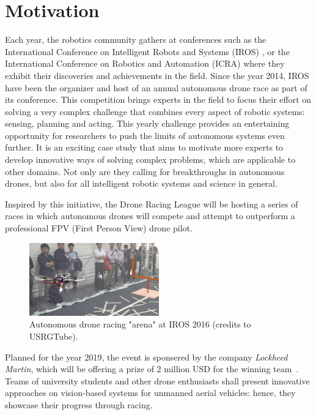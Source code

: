 \section{Motivation}


Each year, the robotics community gathers at conferences such as the
International Conference on Intelligent Robots and Systems (IROS) , or the
International Conference on Robotics and Automation (ICRA) where they exhibit
their discoveries and achievements in the field. Since the year 2014, IROS have
been the organizer and host of an annual autonomous drone race as part of its
conference. This competition brings experts in the field to focus their effort
on solving a very complex challenge that combines every aspect of robotic
systems: sensing, planning and acting. This yearly challenge provides an
entertaining opportunity for researchers to push the limits of autonomous
systems even further. It is an exciting case study that aims to motivate more
experts to develop innovative ways of solving complex problems, which are
applicable to other domains. Not only are they calling for breakthroughs in
autonomous drones, but also for all intelligent robotic systems and science in
general.

Inspired by this initiative, the Drone Racing League will be hosting a series
of races in which autonomous drones will compete and attempt to outperform a
professional FPV (First Person View) drone pilot.\\

\begin{figure}[h]
	\centering
	\includegraphics[width=0.5\textwidth]{figure/iros_2016.jpg}
	\caption{Autonomous drone racing "arena" at IROS 2016 (credits to
	USRGTube).}
	\label{fig:iros}
\end{figure}

Planned for the year 2019, the event is sponsered by the company \emph{Lockheed
Martin}, which will be offering a prize of 2 million USD for the winning
team~\cite{LockheedDRL}. Teams of university students and other drone
enthusiasts shall present innovative approaches on vision-based systems for
unmanned aerial vehicles: hence, they showcase their progress through racing.

